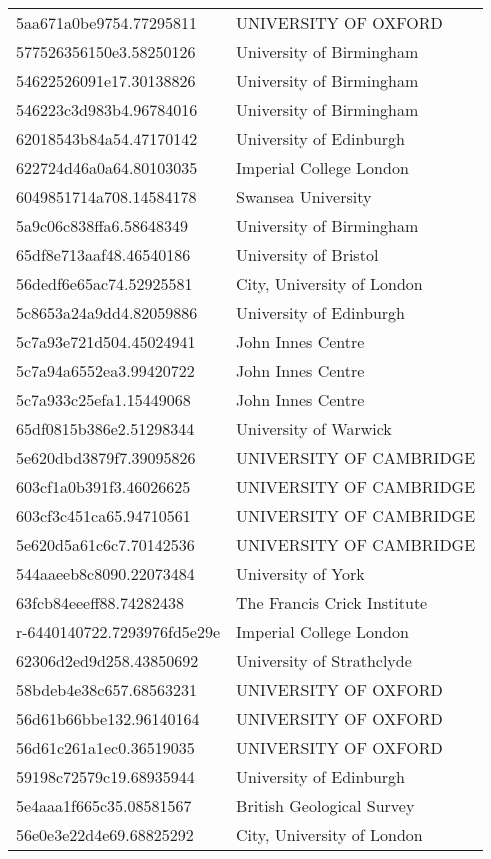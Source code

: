 \begin{tabular}{ll}
5aa671a0be9754.77295811 & UNIVERSITY OF OXFORD \\
577526356150e3.58250126 & University of Birmingham \\
54622526091e17.30138826 & University of Birmingham \\
546223c3d983b4.96784016 & University of Birmingham \\
62018543b84a54.47170142 & University of Edinburgh \\
622724d46a0a64.80103035 & Imperial College London \\
6049851714a708.14584178 & Swansea University \\
5a9c06c838ffa6.58648349 & University of Birmingham \\
65df8e713aaf48.46540186 & University of Bristol \\
56dedf6e65ac74.52925581 & City, University of London \\
5c8653a24a9dd4.82059886 & University of Edinburgh \\
5c7a93e721d504.45024941 & John Innes Centre \\
5c7a94a6552ea3.99420722 & John Innes Centre \\
5c7a933c25efa1.15449068 & John Innes Centre \\
65df0815b386e2.51298344 & University of Warwick \\
5e620dbd3879f7.39095826 & UNIVERSITY OF CAMBRIDGE \\
603cf1a0b391f3.46026625 & UNIVERSITY OF CAMBRIDGE \\
603cf3c451ca65.94710561 & UNIVERSITY OF CAMBRIDGE \\
5e620d5a61c6c7.70142536 & UNIVERSITY OF CAMBRIDGE \\
544aaeeb8c8090.22073484 & University of York \\
63fcb84eeeff88.74282438 & The Francis Crick Institute \\
r-6440140722.7293976fd5e29e & Imperial College London \\
62306d2ed9d258.43850692 & University of Strathclyde \\
58bdeb4e38c657.68563231 & UNIVERSITY OF OXFORD \\
56d61b66bbe132.96140164 & UNIVERSITY OF OXFORD \\
56d61c261a1ec0.36519035 & UNIVERSITY OF OXFORD \\
59198c72579c19.68935944 & University of Edinburgh \\
5e4aaa1f665c35.08581567 & British Geological Survey \\
56e0e3e22d4e69.68825292 & City, University of London \\

\end{tabular}
